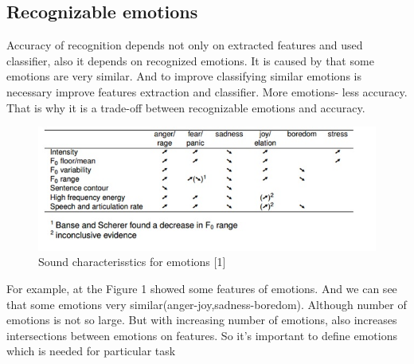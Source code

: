 \documentclass[12pt, letterpaper]{article}
\begin{document}
\subsection{Recognizable emotions}
Accuracy of recognition depends not only on extracted features and used classifier, also it depends on recognized emotions. It is caused by that some emotions are very similar. And to improve classifying similar emotions is necessary improve features extraction and classifier. More emotions- less accuracy. That is why it is a trade-off between recognizable emotions and accuracy.
\begin{figure}[t]
	\centering
		\includegraphics[scale=0.8]{emotion-table-example}
	\caption{Sound characterisstics for emotions [1]}
	\label{fig:emotion-table-example}
\end{figure}

For example, at the Figure 1 showed some features of emotions. And we can see that some emotions very similar(anger-joy,sadness-boredom). Although number of emotions is not so large. But with increasing number of emotions, also increases intersections between emotions on features. So it's important to define emotions which is needed for particular task
\end{document}
